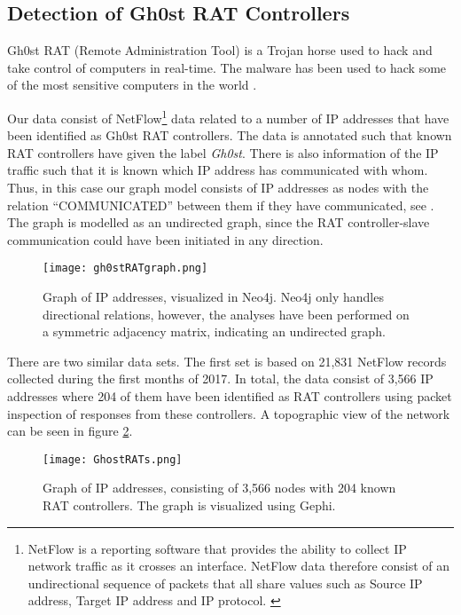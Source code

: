 \subsection{Detection of Gh0st RAT Controllers \label{methodGhost}}
Gh0st RAT (Remote Administration Tool) is a Trojan horse used to hack and take control of computers in real-time. The malware has been used to hack some of the most sensitive computers in the world \citep{cyberspies}.

Our data consist of NetFlow\footnote{NetFlow is a reporting software that provides the ability to collect IP network traffic as it crosses an interface. NetFlow data therefore consist of an undirectional sequence of packets that all share values such as Source IP address, Target IP address and IP protocol. \citep{netflow}} data related to a number of IP addresses that have been identified as Gh0st RAT controllers. The data is annotated such that known RAT controllers have given the label \textit{Gh0st}. There is also information of the IP traffic such that it is known which IP address has communicated with whom. Thus, in this case our graph model consists of IP addresses as nodes with the relation ``COMMUNICATED'' between them if they have communicated, see . The graph is modelled as an undirected graph, since the RAT controller-slave communication could have been initiated in any direction.

\begin{figure}[h!]
    \centering
    \texttt{[image: gh0stRATgraph.png]}
    \caption{Graph of IP addresses, visualized in Neo4j. Neo4j only handles directional relations, however, the analyses have been performed on a symmetric adjacency matrix, indicating an undirected graph.}
    \label{gh0stGraph}
\end{figure}

There are two similar data sets. The first set is based on 21,831 NetFlow records collected during the first months of 2017. In total, the data consist of 3,566 IP addresses where 204 of them have been identified as RAT controllers using packet inspection of responses from these controllers. A topographic view of the network can be seen in figure \ref{ip1}.

\begin{figure}[h!]
    \centering
    \texttt{[image: GhostRATs.png]}
    \caption{Graph of IP addresses, consisting of 3,566 nodes with 204 known RAT controllers. The graph is visualized using Gephi.}
    \label{ip1}
\end{figure}


